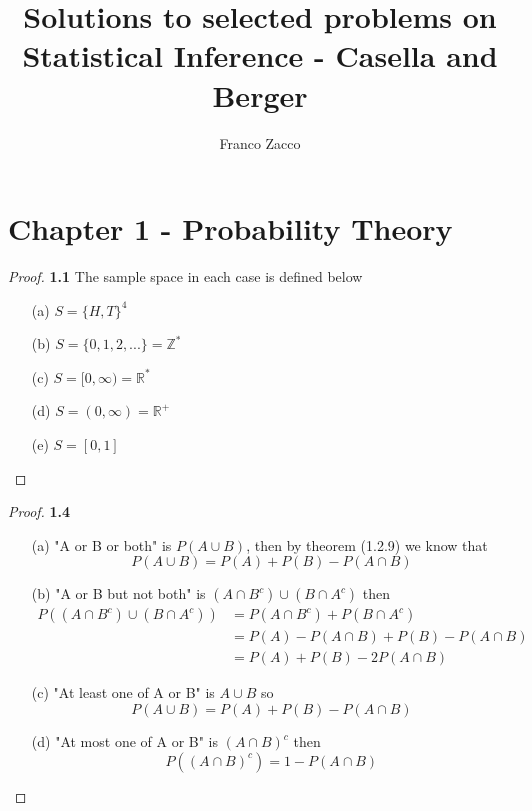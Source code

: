 \documentclass[11pt]{article}
\title{\textbf{Solutions to selected problems on Statistical Inference - Casella and Berger}}
\author{Franco Zacco}
\date{}
\begin{document}
\maketitle
\thispagestyle{empty}

\section*{Chapter 1 - Probability Theory}

	\begin{proof}{\textbf{1.1}}
        The sample space in each case is defined below
        \begin{itemize}
            \item [(a)] $S = \{H,T\}^4$
            \item [(b)] $S = \{0, 1, 2, ...\} = \mathbb{Z^*}$
            \item [(c)] $S = [0, \infty) =  \mathbb{R^*}$
            \item [(d)] $S = (0, \infty) = \mathbb{R^+}$
            \item [(e)] $S = [0, 1]$
        \end{itemize}
    \end{proof}
	\begin{proof}{\textbf{1.4}}
        \begin{itemize}
            \item [(a)] "A or B or both" is $P(A \cup B)$, then by theorem
            (1.2.9) we know that
            $$P(A \cup B) = P(A) + P(B) - P(A \cap B)$$
            \item [(b)] "A or B but not both" is $(A \cap B^c) \cup (B \cap A^c)$
            then
            \begin{align*}
                P((A \cap B^c) \cup (B \cap A^c)) &= P(A \cap B^c) + P(B \cap A^c)\\
                    &= P(A) - P(A \cap B) + P(B) - P(A \cap B)\\
                    &= P(A) + P(B) - 2P(A \cap B)
            \end{align*}
            \item [(c)] "At least one of A or B" is $A \cup B$ so
            $$P(A \cup B) = P(A) + P(B) - P(A \cap B)$$
            \item [(d)] "At most one of A or B" is $(A \cap B)^c$ then
            $$P((A \cap B)^c) = 1 - P(A \cap B)$$
        \end{itemize}
    \end{proof}
\end{document}
